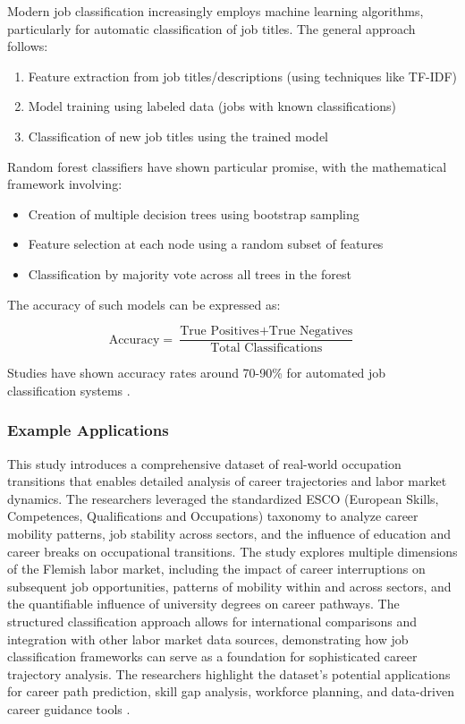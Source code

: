 \documentclass[../main.tex]{subfiles}
\begin{document}
Modern job classification increasingly employs machine learning algorithms, particularly for automatic classification of job titles. The general approach follows:

\begin{enumerate}
\item Feature extraction from job titles/descriptions (using techniques like TF-IDF)
\item Model training using labeled data (jobs with known classifications)
\item Classification of new job titles using the trained model
\end{enumerate}

Random forest classifiers have shown particular promise, with the mathematical framework involving:
\begin{itemize}
\item Creation of multiple decision trees using bootstrap sampling
\item Feature selection at each node using a random subset of features
\item Classification by majority vote across all trees in the forest
\end{itemize}

The accuracy of such models can be expressed as:

\[
\text{Accuracy} = \frac{\text{True Positives} + \text{True Negatives}}{\text{Total Classifications}}
\]

Studies have shown accuracy rates around 70-90\% for automated job classification systems \cite{ikudo2018, jeesr2021}.

\subsubsection{Example Applications}

This study introduces a comprehensive dataset of real-world occupation transitions that enables detailed analysis of career trajectories and labor market dynamics. The researchers leveraged the standardized ESCO (European Skills, Competences, Qualifications and Occupations) taxonomy to analyze career mobility patterns, job stability across sectors, and the influence of education and career breaks on occupational transitions. The study explores multiple dimensions of the Flemish labor market, including the impact of career interruptions on subsequent job opportunities, patterns of mobility within and across sectors, and the quantifiable influence of university degrees on career pathways. The structured classification approach allows for international comparisons and integration with other labor market data sources, demonstrating how job classification frameworks can serve as a foundation for sophisticated career trajectory analysis. The researchers highlight the dataset's potential applications for career path prediction, skill gap analysis, workforce planning, and data-driven career guidance tools \cite{jobhop2022}.
\end{document}
